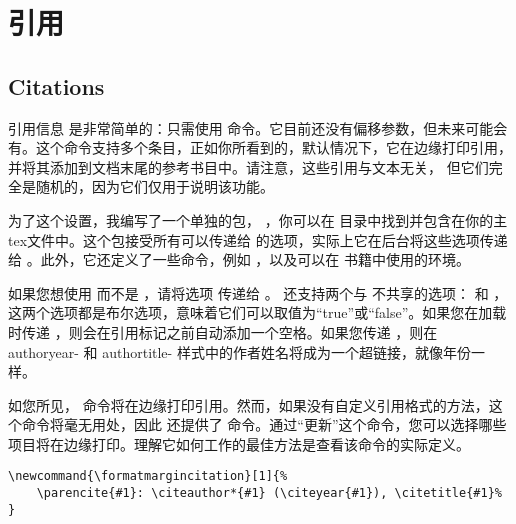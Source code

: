 \chapter{引用}

\section{Citations}


引用信息  是非常简单的：只需使用  命令。它目前还没有偏移参数，但未来可能会有。这个命令支持多个条目，正如你所看到的，默认情况下，它在边缘打印引用，并将其添加到文档末尾的参考书目中。请注意，这些引用与文本无关， 但它们完全是随机的，因为它们仅用于说明该功能。

为了这个设置，我编写了一个单独的包，  ，你可以在  目录中找到并包含在你的主tex文件中。这个包接受所有可以传递给  的选项，实际上它在后台将这些选项传递给 。此外，它还定义了一些命令，例如 ，以及可以在  书籍中使用的环境。

如果您想使用  而不是 ，请将选项  传递给 。 还支持两个与  不共享的选项： 和 ，这两个选项都是布尔选项，意味着它们可以取值为“true”或“false”。如果您在加载  时传递 ，则会在引用标记之前自动添加一个空格。如果您传递 ，则在 authoryear- 和 authortitle- 样式中的作者姓名将成为一个超链接，就像年份一样。

如您所见， 命令将在边缘打印引用。然而，如果没有自定义引用格式的方法，这个命令将毫无用处，因此  还提供了  命令。通过\enquote{更新}这个命令，您可以选择哪些项目将在边缘打印。理解它如何工作的最佳方法是查看该命令的实际定义。


\begin{lstlisting}[breaklines,columns=flexible,style=kaolstplain,linewidth=1.5\textwidth]
\newcommand{\formatmargincitation}[1]{%
	\parencite{#1}: \citeauthor*{#1} (\citeyear{#1}), \citetitle{#1}%
}
\end{lstlisting}

